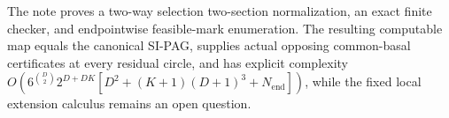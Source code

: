The note proves a two-way selection two-section normalization, an exact finite checker, and endpointwise feasible-mark enumeration.  The resulting computable map equals the canonical SI-PAG, supplies actual opposing common-basal certificates at every residual circle, and has explicit complexity \(O\!\left(6^{\binom D2}2^{D+DK}[D^2+(K+1)(D+1)^3+N_{\mathrm{end}}]\right)\), while the fixed local extension calculus remains an open question.